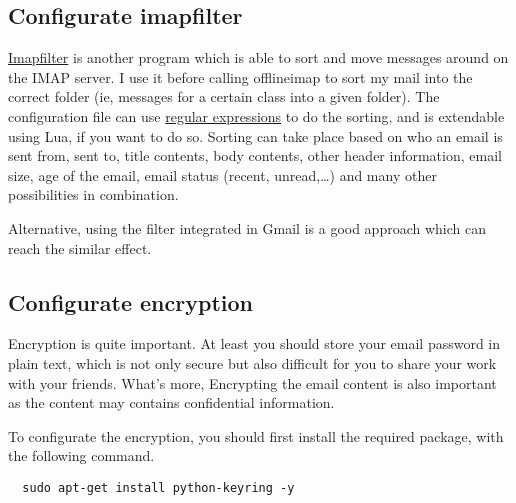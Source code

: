 \documentclass{article}
\begin{document}
\subsection{Configurate imapfilter}
\href{https://github.com/lefcha/imapfilter}{Imapfilter} is another program 
which is able to sort and move messages around on the IMAP server. I use it 
before calling offlineimap to sort my mail into the correct folder (ie, 
messages for a certain class into a given folder).  The configuration file 
can use 
\href{http://en.wikipedia.org/wiki/Regular\_expression\_examples#Examples}{regular 
expressions} to do the sorting, and is extendable using Lua, if you want to 
do so.
Sorting can take place based on who an email is sent from, sent to, title 
contents, body contents, other header information, email size, age of the 
email, email status (recent, unread,…) and many other possibilities in 
combination.

Alternative, using the filter integrated in Gmail is a good approach which can 
reach the similar effect.
\subsection{Configurate encryption}
Encryption is quite important. At least you should store your email password 
in plain text, which is not only secure but also difficult for you to share 
your work with your friends. What's more, Encrypting the email content is also 
important as the content may contains confidential information.

To configurate the encryption, you should first install the required package, 
with the following command.
\begin{lstlisting}
  sudo apt-get install python-keyring -y
\end{lstlisting}
\end{document}
